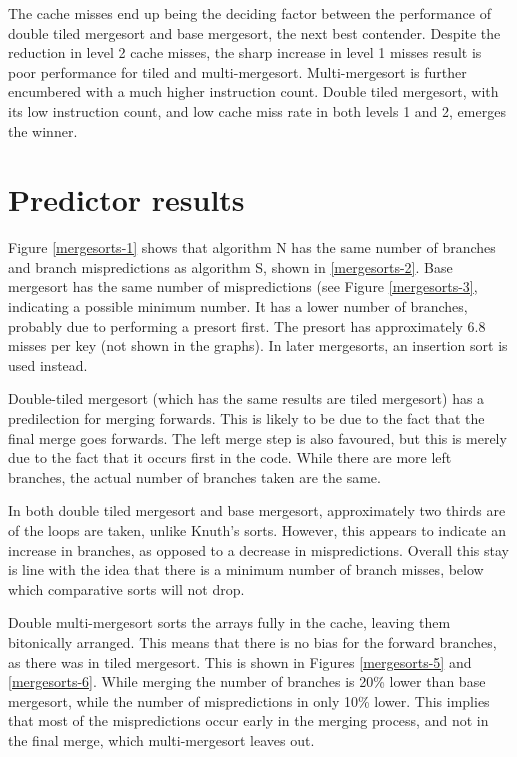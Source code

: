 The cache misses end up being the deciding factor between the performance of
double tiled mergesort and base mergesort, the next best contender. Despite the
reduction in level 2 cache misses, the sharp increase in level 1 misses result
is poor performance for tiled and multi-mergesort. Multi-mergesort is further
encumbered with a much higher instruction count. Double tiled mergesort, with
its low instruction count, and low cache miss rate in both levels 1 and 2,
emerges the winner.

\section{Predictor results}


Figure \ref{mergesorts-1} shows that algorithm N has the same number of branches
and branch mispredictions as algorithm S, shown in \ref{mergesorts-2}. Base
mergesort has the same number of mispredictions (see Figure \ref{mergesorts-3},
indicating a possible minimum number. It has a lower number of branches,
probably due to performing a presort first. The presort has approximately 6.8
misses per key (not shown in the graphs). In later mergesorts, an insertion sort
is used instead.

Double-tiled mergesort (which has the same results are tiled mergesort) has a
predilection for merging forwards. This is likely to be due to the fact that the
final merge goes forwards. The left merge step is also favoured, but this is
merely due to the fact that it occurs first in the code. While there are more
left branches, the actual number of branches taken are the same.

In both double tiled mergesort and base mergesort, approximately two thirds are
of the loops are taken, unlike Knuth's sorts. However, this appears to indicate
an increase in branches, as opposed to a decrease in mispredictions. Overall
this stay is line with the idea that there is a minimum number of branch misses,
below which comparative sorts will not drop.

Double multi-mergesort sorts the arrays fully in the cache, leaving them
bitonically arranged. This means that there is no bias for the forward branches,
as there was in tiled mergesort. This is shown in Figures \ref{mergesorts-5} and
\ref{mergesorts-6}. While merging the number of branches is 20\% lower than base
mergesort, while the number of mispredictions in only 10\% lower. This implies
that most of the mispredictions occur early in the merging process, and not in
the final merge, which multi-mergesort leaves out.

